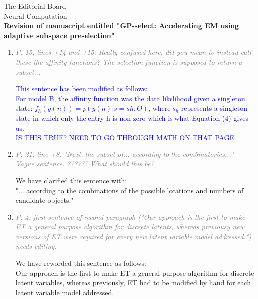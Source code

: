 \documentclass[10pt]{letter}
\newcommand{\rvr}[1]{\textcolor{gray}{#1}}
\newcommand{\rev}[1]{\textcolor{blue}{#1}}
\newcommand{\pr}{\mathrm{pr}}%
\begin{document}
\begin{letter}{
The Editorial Board\\
Neural Computation\\
\vspace{10mm}
\textbf{Revision of manuscript entitled "GP-select: Accelerating EM using adaptive
subspace preselection"}
}
\begin{enumerate}[topsep=3pt,itemsep=2ex,partopsep=1ex,parsep=1ex]
    Model \textbf{C}. \textit{Nonlinear Spike-and-slab sparse coding}:
    \begin{align}
&\hat{W}_{hd}   = \frac{\langle s_h y_d \rangle^*}{\langle s_d^2 \rangle^*}\ 
\text{\quad}
&\hat{\sigma}^2 = \left\langle W_{dh} s_h - y_d^{(n)}\right\rangle^\ast \nonumber\\
%
&\hat{\pi} = \langle \delta(s) \rangle  \text{\quad}\text{\quad}\text{\quad}\nonumber\\
%
&\hat{\mu}_{\pr} = \langle s_h \rangle^* 
 \text{\quad}\text{\quad}\text{\quad}\text{\quad}\text{\quad}\text{\quad}\text{\quad} 
&\hat{\sigma}^2_{\pr} = \langle (s_h - \hat{\mu}_{\pr})^2 \rangle^* \nonumber
%
\end{align}


    \item \rvr{\emph{P. 15, lines +14 and +15: Really confused here, did you mean to instead call these the affinity functions? The selection function is supposed to return a subset...}}

    \rev{This sentence has been modified as follows:\\
For model B, the affinity function was the data likelihood given a singleton state: $f_h (y (n) ) = p(y (n) |s = s h , Θ)$, where $s_h$ represents a singleton state in which only the entry h is non-zero which is what Equation (4) gives us. \\
IS THIS TRUE?  NEED TO GO THROUGH MATH ON THAT PAGE   }


    \item \rvr{\emph{P. 21, line +8: "Next, the subset of... according to the combinatorics..." Vague sentence. ??????  What should this be?}}

We have clarified this sentence with:\\
"... according to the combinations of the possible locations and numbers of candidate objects."

    
    \item \rvr{\emph{ P. 4: first sentence of second paragraph ("Our approach is the first to make ET a general purpose algorithm for discrete latents, whereas previousy new versions of ET were required for every new latent variable model addressed.") needs editing.}}

We have reworded this sentence as follows:\\
Our approach is the first to make ET a general purpose algorithm for discrete latent variables, 
 whereas previously, ET had to be modified by hand for each latent variable model addressed. 


\end{enumerate}
\end{letter}
\end{document}
